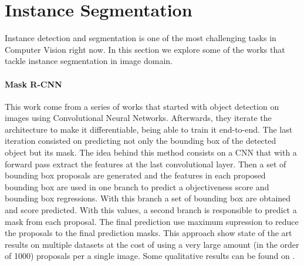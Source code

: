 

\section{Instance Segmentation}
\label{sec:soa:instancesegmentation}

Instance detection and segmentation is one of the most challenging tasks in Computer Vision right now.
In this section we explore some of the works that tackle instance segmentation in image domain. 

\paragraph{Mask R-CNN~\maskrcnn}
This work come from a series of works that started with object detection on images using Convolutional Neural Networks.
Afterwards, they iterate the architecture to make it differentiable, being able to train it end-to-end.
The last iteration consisted on predicting not only the bounding box of the detected object but its mask.
The idea behind this method consists on a CNN that with a forward pass extract the features at the last convolutional layer.
Then a set of bounding box proposals are generated and the features in each proposed bounding box are used in one branch to predict a objectiveness score and bounding box regressions.
With this branch a set of bounding box are obtained and score predicted. With this values, a second branch is responsible to predict a mask from each proposal.
The final prediction use maximum supression to reduce the proposals to the final prediction masks.
This approach show state of the art results on multiple datasets at the cost of using a very large amount (in the order of 1000) proposals per a single image.
Some qualitative results can be found on .

